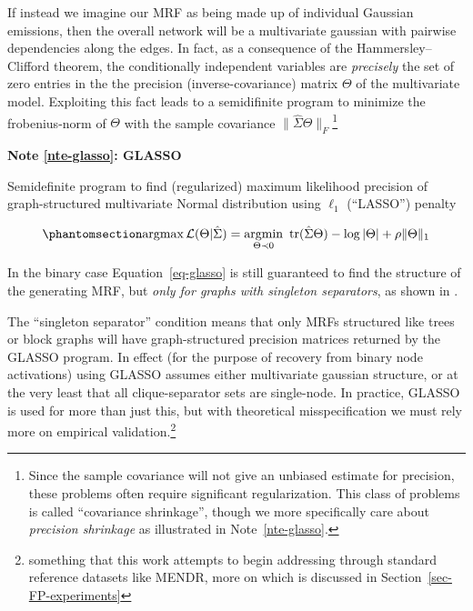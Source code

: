 \documentclass[%
	12pt,
		oneside,
		letterpaper
]{book}
\newcounter{quartocalloutnteno}
\newcommand{\quartocalloutnte}[1]{\refstepcounter{quartocalloutnteno}\label{#1}}
\begin{document}
If instead we imagine our MRF as being made up of individual Gaussian emissions, then the overall network will be a multivariate gaussian with pairwise dependencies along the edges.
In fact, as a consequence of the Hammersley--Clifford theorem, the conditionally independent variables are \emph{precisely} the set of zero entries in the the precision (inverse-covariance) matrix \(\Theta\) of the multivariate model.
Exploiting this fact leads to a semidifinite program to minimize the frobenius-norm of \(\Theta\) with the sample covariance \(\| \hat{\Sigma}\Theta \|_F\)\footnote{
  Since the sample covariance will not give an unbiased estimate for precision, these problems often require significant regularization.
  This class of problems is called ``covariance shrinkage'', though we more specifically care about \emph{precision shrinkage} as illustrated in Note~\ref{nte-glasso}.}

\begin{tcolorbox}[enhanced jigsaw, toprule=.15mm, left=2mm, leftrule=.75mm, rightrule=.15mm, colframe=quarto-callout-note-color-frame, arc=.35mm, colback=white, opacityback=0, bottomrule=.15mm, breakable]

\quartocalloutnte{nte-glasso} 

\vspace{-3mm}\textbf{Note \ref*{nte-glasso}: GLASSO}\vspace{3mm}

Semidefinite program to find (regularized) maximum likelihood precision of graph-structured multivariate Normal distribution using \(\ell_1\) (``LASSO'') penalty \autocite{Sparseinversecovariance_Friedman2008}

\begin{equation}\phantomsection\label{eq-glasso}{
\operatorname*{argmax} \mathcal{L}(\Theta|\hat{\Sigma})
  = \operatorname*{argmin}_{\Theta \prec 0}\ \text{tr}(\hat{\Sigma} \Theta) - \log |\Theta|+ \rho\|\Theta\|_1
}\end{equation}

In the binary case Equation~\ref{eq-glasso} is still guaranteed to find the structure of the generating MRF, but \emph{only for graphs with singleton separators}, as shown in \textcite{Structureestimationdiscrete_Loh2012}.

\end{tcolorbox}

The ``singleton separator'' condition means that only MRFs structured like trees or block graphs will have graph-structured precision matrices returned by the GLASSO program.
In effect (for the purpose of recovery from binary node activations) using GLASSO assumes either multivariate gaussian structure, or at the very least that all clique-separator sets are single-node.
In practice, GLASSO is used for more than just this, but with theoretical misspecification we must rely more on empirical validation.\footnote{
  something that this work attempts to begin addressing through standard reference datasets like MENDR, more on which is discussed in Section~\ref{sec-FP-experiments}}
\end{document}
